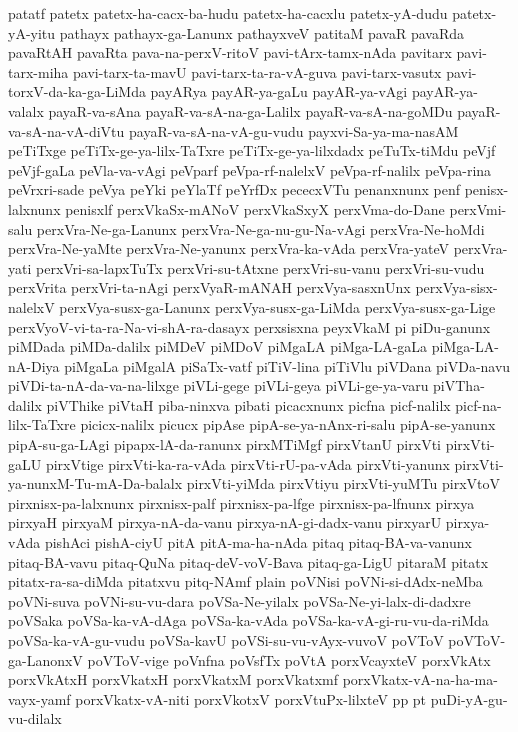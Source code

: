 {patatf
patetx
patetx-ha-cacx-ba-hudu
patetx-ha-cacxlu
patetx-yA-dudu
patetx-yA-yitu
pathayx
pathayx-ga-Lanunx
pathayxveV
patitaM
pavaR
pavaRda
pavaRtAH
pavaRta
pava-na-perxV-ritoV
pavi-tArx-tamx-nAda
pavitarx
pavi-tarx-miha
pavi-tarx-ta-mavU
pavi-tarx-ta-ra-vA-guva
pavi-tarx-vasutx
pavi-torxV-da-ka-ga-LiMda
payARya
payAR-ya-gaLu
payAR-ya-vAgi
payAR-ya-valalx
payaR-va-sAna
payaR-va-sA-na-ga-Lalilx
payaR-va-sA-na-goMDu
payaR-va-sA-na-vA-diVtu
payaR-va-sA-na-vA-gu-vudu
payxvi-Sa-ya-ma-nasAM
peTiTxge
peTiTx-ge-ya-lilx-TaTxre
peTiTx-ge-ya-lilxdadx
peTuTx-tiMdu
peVjf
peVjf-gaLa
peVla-va-vAgi
peVparf
peVpa-rf-nalelxV
peVpa-rf-nalilx
peVpa-rina
peVrxri-sade
peVya
peYki
peYlaTf
peYrfDx
pececxVTu
penanxnunx
penf
penisx-lalxnunx
penisxlf
perxVkaSx-mANoV
perxVkaSxyX
perxVma-do-Dane
perxVmi-salu
perxVra-Ne-ga-Lanunx
perxVra-Ne-ga-nu-gu-Na-vAgi
perxVra-Ne-hoMdi
perxVra-Ne-yaMte
perxVra-Ne-yanunx
perxVra-ka-vAda
perxVra-yateV
perxVra-yati
perxVri-sa-lapxTuTx
perxVri-su-tAtxne
perxVri-su-vanu
perxVri-su-vudu
perxVrita
perxVri-ta-nAgi
perxVyaR-mANAH
perxVya-sasxnUnx
perxVya-sisx-nalelxV
perxVya-susx-ga-Lanunx
perxVya-susx-ga-LiMda
perxVya-susx-ga-Lige
perxVyoV-vi-ta-ra-Na-vi-shA-ra-dasayx
perxsisxna
peyxVkaM
pi
piDu-ganunx
piMDada
piMDa-dalilx
piMDeV
piMDoV
piMgaLA
piMga-LA-gaLa
piMga-LA-nA-Diya
piMgaLa
piMgalA
piSaTx-vatf
piTiV-lina
piTiVlu
piVDana
piVDa-navu
piVDi-ta-nA-da-va-na-lilxge
piVLi-gege
piVLi-geya
piVLi-ge-ya-varu
piVTha-dalilx
piVThike
piVtaH
piba-ninxva
pibati
picacxnunx
picfna
picf-nalilx
picf-na-lilx-TaTxre
picicx-nalilx
picucx
pipAse
pipA-se-ya-nAnx-ri-salu
pipA-se-yanunx
pipA-su-ga-LAgi
pipapx-lA-da-ranunx
pirxMTiMgf
pirxVtanU
pirxVti
pirxVti-gaLU
pirxVtige
pirxVti-ka-ra-vAda
pirxVti-rU-pa-vAda
pirxVti-yanunx
pirxVti-ya-nunxM-Tu-mA-Da-balalx
pirxVti-yiMda
pirxVtiyu
pirxVti-yuMTu
pirxVtoV
pirxnisx-pa-lalxnunx
pirxnisx-palf
pirxnisx-pa-lfge
pirxnisx-pa-lfnunx
pirxya
pirxyaH
pirxyaM
pirxya-nA-da-vanu
pirxya-nA-gi-dadx-vanu
pirxyarU
pirxya-vAda
pishAci
pishA-ciyU
pitA
pitA-ma-ha-nAda
pitaq
pitaq-BA-va-vanunx
pitaq-BA-vavu
pitaq-QuNa
pitaq-deV-voV-Bava
pitaq-ga-LigU
pitaraM
pitatx
pitatx-ra-sa-diMda
pitatxvu
pitq-NAmf
plain
poVNisi
poVNi-si-dAdx-neMba
poVNi-suva
poVNi-su-vu-dara
poVSa-Ne-yilalx
poVSa-Ne-yi-lalx-di-dadxre
poVSaka
poVSa-ka-vA-dAga
poVSa-ka-vAda
poVSa-ka-vA-gi-ru-vu-da-riMda
poVSa-ka-vA-gu-vudu
poVSa-kavU
poVSi-su-vu-vAyx-vuvoV
poVToV
poVToV-ga-LanonxV
poVToV-vige
poVnfna
poVsfTx
poVtA
porxVcayxteV
porxVkAtx
porxVkAtxH
porxVkatxH
porxVkatxM
porxVkatxmf
porxVkatx-vA-na-ha-ma-vayx-yamf
porxVkatx-vA-niti
porxVkotxV
porxVtuPx-lilxteV
pp
pt
puDi-yA-gu-vu-dilalx
}
